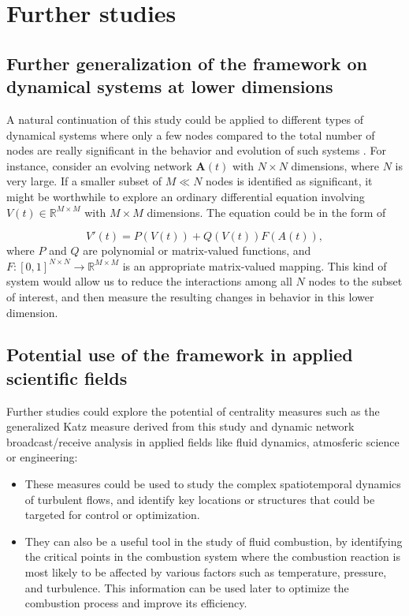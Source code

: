 
\chapter{Further studies}
\label{chap:further}
 
\section*{Further generalization of the framework on dynamical systems at lower dimensions}
A natural continuation of this study could be applied to different types of dynamical systems where only a few nodes compared to the total number of nodes are really significant in the behavior and evolution of such systems \cite{grindrod2014dynamical}. For instance, consider an evolving network $\mathbf{A}(t)$ with $N \times N$ dimensions, where $N$ is very large. If a smaller subset of $M\ll N$ nodes is identified as significant, it might be worthwhile to explore an ordinary differential equation involving $V(t)\in \mathbb{R}^{M\times M}$ with $M\times M$ dimensions. The equation could be in the form of 

$$V'(t)=P(V(t)) + Q(V(t))F(A(t)),$$ where $P$ and $Q$ are polynomial or matrix-valued functions, and $F: [0, 1]^{N×N} \to \mathbb{R}^{M\times M}$ is an appropriate matrix-valued mapping. This kind of system would allow us to reduce the interactions among all $N$ nodes to the subset of interest, and then measure the resulting changes in behavior in this lower dimension.

\section*{Potential use of the framework in applied scientific fields} 
Further studies could explore the potential of centrality measures such as the generalized Katz measure derived from this study and dynamic network broadcast/receive analysis in applied fields like fluid dynamics, atmosferic science or engineering: 

\begin{itemize}
  \item These measures could be used to study the complex spatiotemporal dynamics of turbulent flows, and identify key locations or structures that could be targeted for control or optimization. 
  \item They can also be a useful tool in the study of fluid combustion, by identifying the critical points in the combustion system where the combustion reaction is most likely to be affected by various factors such as temperature, pressure, and turbulence. This information can be used later to optimize the combustion process and improve its efficiency.
\end{itemize}
	
